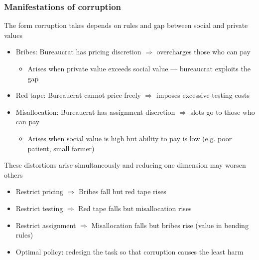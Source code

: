 \documentclass[aspectratio=169]{beamer}
\begin{document}
\begin{frame}
\frametitle{Manifestations of corruption}
The form corruption takes depends on rules and gap between social and private values
\begin{itemize}\setlength\itemsep{3pt}
\item Bribes: Bureaucrat has pricing discretion $\Rightarrow$ overcharges those who can pay
\begin{itemize}\setlength\itemsep{3pt}
\item Arises when private value exceeds social value — bureaucrat exploits the gap
\end{itemize}
\item Red tape: Bureaucrat cannot price freely $\Rightarrow$ imposes excessive testing costs
\item Misallocation: Bureaucrat has assignment discretion $\Rightarrow$ slots go to those who can pay
\begin{itemize}\setlength\itemsep{3pt}
\item Arises when social value is high but ability to pay is low (e.g. poor patient, small farmer)
\end{itemize}
\end{itemize}\medskip
These distortions arise simultaneously and reducing one dimension may worsen others
\begin{itemize}\setlength\itemsep{3pt}
\item Restrict pricing $\Rightarrow$ Bribes fall but red tape rises
\item Restrict testing $\Rightarrow$ Red tape falls but misallocation rises
\item Restrict assignment $\Rightarrow$ Misallocation falls but bribes rise (value in bending rules)
\item Optimal policy: redesign the task so that corruption causes the least harm
\end{itemize}
\end{frame}
\end{document}
